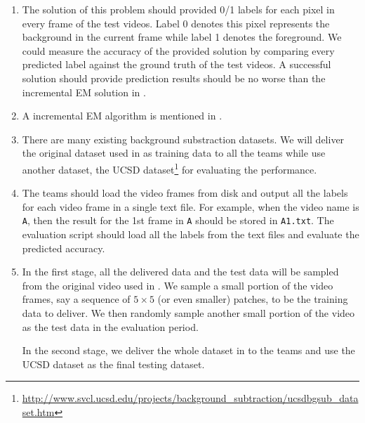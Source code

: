 \begin{enumerate}[i]
\item The solution of this problem should provided 0/1 labels for each pixel in every frame of the test videos. Label 0 denotes this pixel represents the background in the current frame while label 1 denotes the foreground. We could measure the accuracy of the provided solution by comparing every predicted label against the ground truth of the test videos. A successful solution should provide prediction results should be no worse than the incremental EM solution in \cite{friedman1997image}.
\item A incremental EM algorithm is mentioned in \cite{friedman1997image}.
\item There are many existing background substraction datasets. We will deliver the original dataset used in \cite{friedman1997image} as training data to all the teams while use another dataset, the UCSD dataset\footnote{\url{http://www.svcl.ucsd.edu/projects/background_subtraction/ucsdbgsub_dataset.htm}} for evaluating the performance.
\item The teams should load the video frames from disk and output all the labels for each video frame in a single text file. For example, when the video name is \texttt{A}, then the result for the 1st frame in \texttt{A} should be stored in \texttt{A1.txt}. The evaluation script should load all the labels from the text files and evaluate the predicted accuracy.
\item In the first stage, all the delivered data and the test data will be sampled from the original video used in \cite{friedman1997image}. We sample a small portion of the video frames, say a sequence of $5\times5$ (or even smaller) patches, to be the training data to deliver. We then randomly sample another small portion of the video as the test data in the evaluation period. 
    
    In the second stage, we deliver the whole dataset in \cite{friedman1997image} to the teams and use the UCSD dataset as the final testing dataset. 
\end{enumerate}